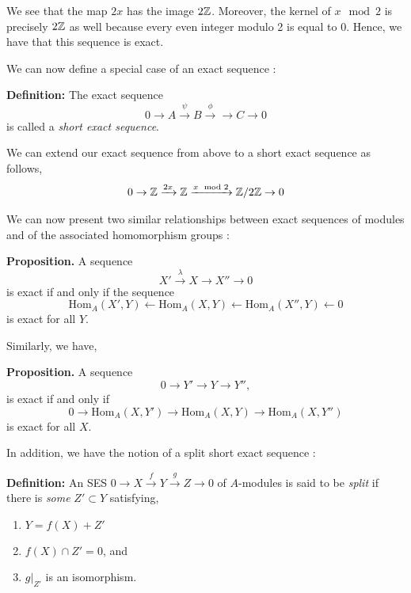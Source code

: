 \documentclass[11pt, reqno]{amsart}
\theoremstyle{plain}
\theoremstyle{definition}
\theoremstyle{example}
\def\Hom{\mathrm{Hom}}
\begin{document}
We see that the map $2x$ has the image $2\mathbb{Z}$. Moreover, the kernel of $x \mod 2$ is precisely $2\mathbb{Z}$ as well because every even integer modulo 2 is equal to $0$. Hence, we have that this sequence is exact.

\par
We can now define a special case of an exact sequence \cite[\S 10.5, p.379]{dummit}:

\par
\textbf{Definition:} The exact sequence $$0 \rightarrow A \xrightarrow{\psi} B \xrightarrow{\phi} \rightarrow C \rightarrow 0$$ is called a \textit{short exact sequence}.

\par
We can extend our exact sequence from above to a short exact sequence as follows,
\begin{align*}
0 \rightarrow \mathbb{Z} \xrightarrow{2x} \mathbb{Z} \xrightarrow{x \mod 2} \mathbb{Z}/2\mathbb{Z} \rightarrow 0
\end{align*}

\par
We can now present two similar relationships between exact sequences of modules and of the associated homomorphism groups \cite[\S 2.2, p. 122]{lang}:

\par
\textbf{Proposition.} A sequence 
$$X' \xrightarrow{\lambda} X \to X'' \to 0$$ is exact if and only if the sequence $$\Hom_A(X', Y) \leftarrow \Hom_A(X, Y) \leftarrow  \Hom_A(X'', Y) \leftarrow 0$$ is exact for all $Y$.

\par
Similarly, we have,

\par
\textbf{Proposition.} A sequence $$0 \rightarrow Y' \rightarrow Y \rightarrow Y'',$$ is exact if and only if $$0 \rightarrow \Hom_A(X, Y') \rightarrow \Hom_A(X, Y) \rightarrow \Hom_A(X, Y'')$$ is exact for all $X$.

\par
In addition, we have the notion of a split short exact sequence \cite[Lec 10, p.6]{dau}:

\par
\textbf{Definition:} An SES $0 \rightarrow X \xrightarrow{f} Y \xrightarrow{g} Z \rightarrow 0$ of $A$-modules is said to be \textit{split} if there is \textit{some} $Z' \subset Y$ satisfying,
\begin{enumerate}
\item $Y = f(X) + Z'$
\item $f(X) \cap Z' = 0$, and
\item $g|_{Z'}$ is an isomorphism.
\end{enumerate}
\end{document}
